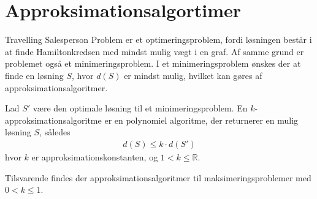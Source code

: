 \section{Approksimationsalgortimer}
Travelling Salesperson Problem er et optimeringsproblem, fordi løsningen består i at finde Hamiltonkredsen med mindst mulig vægt i en graf. 
Af samme grund er problemet også et minimeringsproblem. 
I et minimeringsproblem ønskes der at finde en løsning $S$, hvor $d(S)$ er mindst mulig, hvilket kan gøres af approksimationsalgoritmer.

\begin{defn}\label{def:apk}
Lad $S'$ være den optimale løsning til et minimeringsproblem. En $k$-approksimationsalgoritme er en polynomiel algoritme, der returnerer en mulig løsning $S$, således
\begin{align*}
d(S) \leq k \cdot d(S')
\end{align*}
hvor $k$ er approksimationskonstanten, og $1 < k \leq \mathbb{R}$.
\end{defn}

Tilsvarende findes der approksimationsalgoritmer til maksimeringsproblemer med $0 < k \leq 1$.